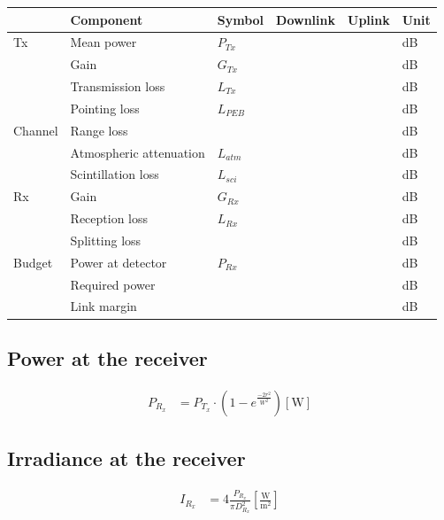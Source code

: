 \documentclass[a4paper]{article}
\begin{document}
\begin{center}
\begin{table}[]
\begin{tabular}{|l|l|l|l|l|l|}
\hline
        & Component               & Symbol    & Downlink & Uplink & Unit \\ \hline
Tx      & Mean power              & $P_{Tx}$  &          &        & dB   \\
        & Gain                    & $G_{Tx}$  &          &        & dB   \\
        & Transmission loss       & $L_{Tx}$  &          &        & dB   \\
        & Pointing loss           & $L_{PEB}$ &          &        & dB   \\ \hline
Channel & Range loss              &           &          &        & dB   \\
        & Atmospheric attenuation & $L_{atm}$ &          &        & dB   \\
        & Scintillation loss      & $L_{sci}$ &          &        & dB   \\ \hline
Rx      & Gain                    & $G_{Rx}$  &          &        & dB   \\
        & Reception loss          & $L_{Rx}$  &          &        & dB   \\
        & Splitting loss          &           &          &        & dB   \\ \hline
Budget  & Power at detector       & $P_{Rx}$  &          &        & dB   \\
        & Required power          &           &          &        & dB   \\ \hline
        & Link margin             &           &          &        & dB   \\ \hline
\end{tabular}
\end{table}
\end{center}

\subsection{Power at the receiver}
\begin{align*}
P_{R_x} &= P_{T_x}\cdot \left(1-e^\frac{-2r^2}{W^2}\right) [\textrm{W}]
\end{align*}

\subsection{Irradiance at the receiver}
\begin{align*}
I_{R_x} &= 4\frac{P_{R_x}}{\pi D_{R_x}^2} \left[ \frac{\textrm{W}}{\textrm{m}^2} \right]
\end{align*}
\end{document}

